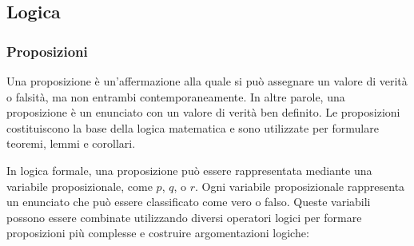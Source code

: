\subsection{Logica}
    \subsubsection{Proposizioni}
        Una proposizione è un'affermazione alla quale si può assegnare un valore di verità o falsità, ma non entrambi contemporaneamente. In altre parole, una proposizione è un enunciato con un valore di verità ben definito. Le proposizioni costituiscono la base della logica matematica e sono utilizzate per formulare teoremi, lemmi e corollari.
    
        In logica formale, una proposizione può essere rappresentata mediante una variabile proposizionale, come \( p \), \( q \), o \( r \). Ogni variabile proposizionale rappresenta un enunciato che può essere classificato come vero o falso. Queste variabili possono essere combinate utilizzando diversi operatori logici per formare proposizioni più complesse e costruire argomentazioni logiche:
    
